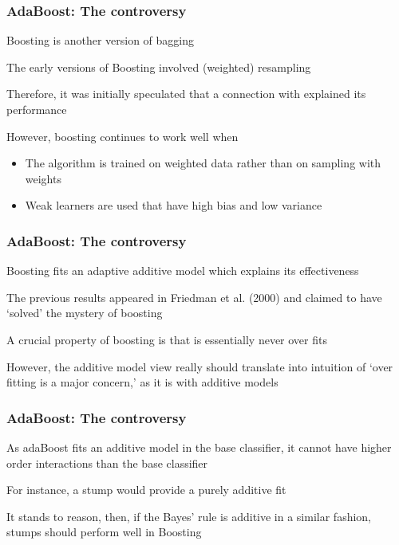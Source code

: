 \documentclass[12pt]{beamer}
\begin{document}
\begin{frame}[fragile]
\frametitle{AdaBoost: The controversy}
  Boosting is another version of bagging

\vsp
The early versions of Boosting involved (weighted) resampling

\vsp
Therefore, it was initially speculated that a connection with  explained its performance

\vsp
However, boosting continues to work well when
\begin{itemize}
\item The algorithm is trained on weighted data rather than on sampling with weights

\item Weak learners are used that have high bias and low variance

\end{itemize}
\end{frame}

\begin{frame}[fragile]
\frametitle{AdaBoost: The controversy}
  Boosting fits an adaptive additive model which explains its effectiveness

\vsp
The previous results appeared in Friedman et al. (2000) and claimed to have `solved' the mystery of boosting

\vsp
A crucial property of boosting is that is essentially never over fits

\vsp
However, the additive model view really should translate into intuition of `over fitting is a major concern,' as it is with
additive models
\end{frame}

\begin{frame}[fragile]
\frametitle{AdaBoost: The controversy}
As adaBoost fits an additive model in the base classifier, it cannot have higher order interactions than the 
base classifier

\vsp
For instance, a stump would provide a purely additive fit


\vsp
It stands to reason, then, if the Bayes' rule is additive in a similar fashion, stumps should perform well in Boosting
\end{frame}
\end{document}
